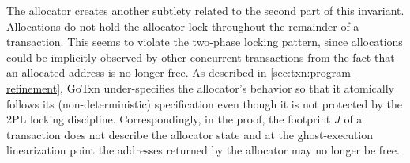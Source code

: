 The allocator creates another subtlety related to the second part of this
invariant. Allocations do not hold the allocator lock throughout the remainder
of a transaction. This seems to violate the two-phase locking pattern, since
allocations could be implicitly observed by other concurrent transactions from
the fact that an allocated address is no longer free. As described in
\cref{sec:txn:program-refinement}, GoTxn under-specifies the allocator's behavior so that it
atomically follows its (non-deterministic) specification even though it is not
protected by the 2PL locking discipline. Correspondingly, in the
proof, the footprint $J$ of a transaction does not describe the allocator state
and at the ghost-execution linearization point the addresses returned by the
allocator may no longer be free.


